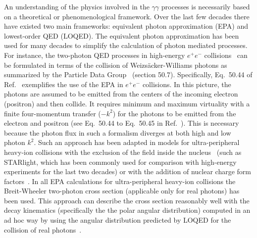 \documentclass[twocolumn,epjc3]{svjour3}\sloppy
\begin{document}
An understanding of the physics involved in the $\gamma\gamma$ processes is necessarily based on a theoretical or phenomenological framework. Over the last few decades there have existed two main frameworks: equivalent photon approximation (EPA) and lowest-order QED (LOQED). 
The equivalent photon approximation has been used for many decades to simplify the calculation of photon mediated processes.
For instance, the two-photon QED processes in high-energy $e^+e^-$ collisions~\cite{brodskyTwoPhotonMechanismParticle1971a,budnev_two-photon_1975} can be formulated in terms of the collision of Weizsäcker-Williams photons as summarized by the Particle Data Group~\cite{zyla_review_2020} (section 50.7).
Specifically, Eq.~50.44 of Ref.~\cite{zyla_review_2020} exemplifies the use of the EPA in $e^+e^-$ collisions.  
In this picture, the photons are assumed to be emitted from the centers of the incoming electron (positron) and then collide. 
It requires minimum and maximum virtuality with a finite four-momentum transfer ($-k^2$) for the photons to be emitted from the electron and positron (see Eq.~50.44 to Eq.~50.45 in Ref.~\cite{zyla_review_2020}). 
This is necessary because the photon flux in such a formalism diverges at both high and low photon $k^2$. 
Such an approach has been adapted in models for ultra-peripheral heavy-ion collisions with the exclusion of the field inside the nucleus~\cite{kleinSTARlightMonteCarlo2017b,kleinExclusiveVectorMeson1999a} (such as STARlight, which has been commonly used for comparison with high-energy experiments for the last two decades) or with the addition of nuclear charge form factors~\cite{klein_two-photon_2018}.
In all EPA calculations for ultra-peripheral heavy-ion collisions the Breit-Wheeler two-photon cross section (applicable only for real photons) has been used. 
This approach can describe the cross section reasonably well with the decay kinematics (specifically the the polar angular distribution) computed in an ad hoc way by using the angular distribution predicted by LOQED for the collision of real photons~\cite{brodskyTwoPhotonMechanismParticle1971a,kleinSTARlightMonteCarlo2017b}. 
\end{document}

